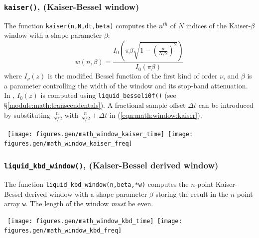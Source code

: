 \subsubsection{{\tt kaiser()}, (Kaiser-Bessel window)}
\label{module:math:window:kaiser}
The function {\tt kaiser(n,N,dt,beta)} computes the $n^{th}$ of $N$
indices of the Kaiser-$\beta$ window with a shape parameter $\beta$:
%
\begin{equation}
\label{eqn:math:window:kaiser}
    w(n,\beta) = \frac{
        I_0\left(\pi\beta\sqrt{1-\left(\frac{n}{N/2}\right)^2}\right)
    }{
        I_0\left(\pi\beta\right)
    }
\end{equation}
%
where $I_\nu(z)$ is the modified Bessel function of the first kind of
order $\nu$, and $\beta$ is a parameter controlling the width of the
window and its stop-band attenuation.
In \liquid, $I_0(z)$ is computed using {\tt liquid\_besseli0f()}
(see \S\ref{module:math:transcendentals}).
A fractional sample offset $\Delta t$ can be introduced by substituting
$\frac{n}{N/2}$ with
$\frac{n}{N/2} + \Delta t$ in (\ref{eqn:math:window:kaiser}).

%
% 
\mbox{
  \centering
  \texttt{[image: figures.gen/math\_window\_kaiser\_time]}
  \quad
  \texttt{[image: figures.gen/math\_window\_kaiser\_freq]}
}
%

\subsubsection{{\tt liquid\_kbd\_window()}, (Kaiser-Bessel derived window)}
\label{module:math:window:kbd}
The function {\tt liquid\_kbd\_window(n,beta,*w)}
computes the $n$-point Kaiser-Bessel derived window with a shape
parameter $\beta$ storing the result in the $n$-point array {\tt w}.
The length of the window {\em must} be even.

%
% 
\mbox{
  \centering
  \texttt{[image: figures.gen/math\_window\_kbd\_time]}
  \quad
  \texttt{[image: figures.gen/math\_window\_kbd\_freq]}
}
%


% 
%
